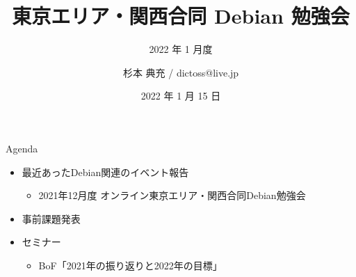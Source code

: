 \title{東京エリア・関西合同 Debian 勉強会}
\subtitle{2022 年 1 月度} %
\author{杉本 典充 / dictoss@live.jp}
\date{2022 年 1 月 15 日}



\begin{frame}
\titlepage{}
\end{frame}

\begin{frame}{Agenda}
 \begin{minipage}[t]{0.45\hsize}
  \begin{itemize}
  \item 最近あったDebian関連のイベント報告
    \begin{itemize}
    \item 2021年12月度 オンライン東京エリア・関西合同Debian勉強会
    \end{itemize}
  \item 事前課題発表
  \end{itemize}
 \end{minipage}
 \begin{minipage}[t]{0.45\hsize}
   \begin{itemize}
   \item セミナー
     \begin{itemize}
     \item BoF「2021年の振り返りと2022年の目標」
     \end{itemize}
  \end{itemize}
 \end{minipage}
\end{frame}

